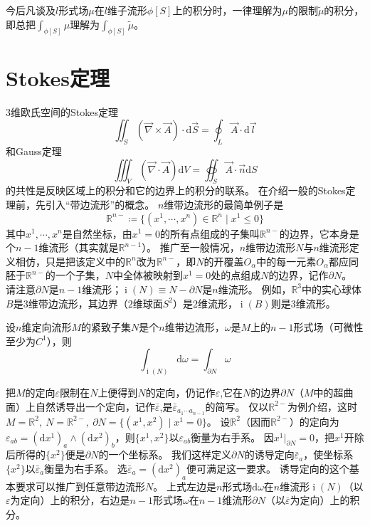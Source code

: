 今后凡谈及$l$形式场$\mu$在$l$维子流形$\phi[S]$上的积分时，一律理解为$\mu$的限制$\tilde\mu$的积分，即总把$\displaystyle\int_{\phi[S]}\mu$理解为$\displaystyle\int_{\phi[S]}\tilde\mu$。

\section{Stokes定理}

$3$维欧氏空间的Stokes定理
$$\iint_S(\vec\nabla \times \vec{A})\cdot\mathrm{d}\vec{S} = \oint_L\vec{A}\cdot\mathrm{d}\vec{l}$$
和Gauss定理
$$\iiint_V(\vec\nabla\cdot\vec{A})\mathrm{d}V = \oiint_S\vec{A}\cdot\vec{n}\mathrm{d}S$$
的共性是反映区域上的积分和它的边界上的积分的联系。
在介绍一般的Stokes定理前，先引入``带边流形''的概念。
$n$维带边流形的最简单例子是
$$\mathbb{R}^{n-} \coloneq \{(x^1, \cdots, x^n) \in \mathbb{R}^n \mid x^1 \leq 0\}$$
其中$x^1, \cdots, x^n$是自然坐标，由$x^1 = 0$的所有点组成的子集叫$\mathbb{R}^{n-}$的边界，它本身是个$n - 1$维流形（其实就是$\mathbb{R}^{n - 1}$）。
推广至一般情况，$n$维带边流形$N$与$n$维流形定义相仿，只是把该定义中的$\mathbb{R}^n$改为$\mathbb{R}^{n-}$，即$N$的开覆盖${O_\alpha}$中的每一元素$O_\alpha$都应同胚于$\mathbb{R}^{n-}$的一个子集，$N$中全体被映射到$x^1 = 0$处的点组成$N$的边界，记作$\partial N$。
请注意$\partial N$是$n - 1$维流形；$\operatorname{i}(N) \equiv N - \partial N$是$n$维流形。
例如，$\mathbb{R}^3$中的实心球体$B$是$3$维带边流形，其边界（$2$维球面$S^2$）是$2$维流形，$\operatorname{i}(B)$则是$3$维流形。

\begin{theorem}
    设$n$维定向流形$M$的紧致子集$N$是个$n$维带边流形，$\omega$是$M$上的$n - 1$形式场（可微性至少为$C^1$），则
    $$\int_{\operatorname{i}(N)}\mathrm{d}\omega = \int_{\partial N}\omega$$
\end{theorem}

\begin{note}
    把$M$的定向$\varepsilon$限制在$N$上便得到$N$的定向，仍记作$\varepsilon$,它在$N$的边界$\partial N$（$M$中的超曲面）上自然诱导出一个定向，记作$\bar\varepsilon$,是$\bar\varepsilon_{a_1 \cdots a_{n - 1}}$的简写。
    仅以$\mathbb{R}^{2-}$为例介绍，这时$M = \mathbb{R}^2, ~ N = \mathbb{R}^{2-}, ~ \partial N = \{(x^1, x^2) \mid x^1 = 0\}$。
    设$\mathbb{R}^2$（因而$\mathbb{R}^{2-}$）的定向为$\varepsilon_{ab} = (\mathrm{d}x^1)_a \wedge (\mathrm{d}x^2)_b$，则$\{x^1, x^2\}$以$\varepsilon_{ab}$衡量为右手系。
    因$x^1|_{\partial N} = 0$，把$x^1$开除后所得的$\{x^2\}$便是$\partial N$的一个坐标系。
    我们这样定义$\partial N$的诱导定向$\bar\varepsilon_a$，使坐标系$\{x^2\}$以$\bar\varepsilon_a$衡量为右手系。
    选$\bar\varepsilon_a = (\mathrm{d}x^2)_a$便可满足这一要求。
    诱导定向的这个基本要求可以推广到任意带边流形$N$。
    上式左边是$n$形式场$\mathrm{d}\omega$在$n$维流形$\operatorname{i}(N)$（以$\varepsilon$为定向）上的积分，右边是$n - 1$形式场$\omega$在$n - 1$维流形$\partial N$（以$\bar\varepsilon$为定向）上的积分。
\end{note}

